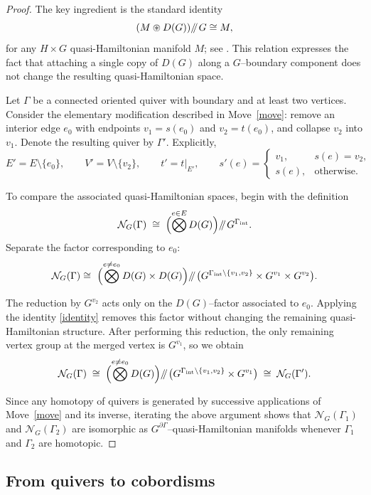 \documentclass[reqno]{amsart}
\theoremstyle{plain}
\theoremstyle{definition}
\newcommand{\N}{\mathcal{N}}
\newcommand{\sll}[1]{\mkern-4mu\mathbin{/\mkern-5mu/}_{\mkern-4mu{#1}}}
\begin{document}
\begin{proof}
The key ingredient is the standard identity
\begin{equation}\label{identity}
    (M \circledast D(G))\sll{} G \cong M,
\end{equation}
for any $H \times G$ quasi-Hamiltonian manifold $M$; see
\cite[Example~9.1]{alekseev1998}.  This relation expresses the fact that attaching a single copy of $D(G)$ along a $G$–boundary component does not change the resulting quasi-Hamiltonian space.

Let $\Gamma$ be a connected oriented quiver with boundary and at least two
vertices.  Consider the elementary modification described in Move~\ref{move}:
remove an interior edge $e_0$ with endpoints $v_1 = s(e_0)$ and
$v_2 = t(e_0)$, and collapse $v_2$ into $v_1$.  Denote the resulting quiver by
$\Gamma'$.  Explicitly,
\[
E' = E \setminus \{e_0\}, \qquad
V' = V \setminus \{v_2\}, \qquad
t' = t|_{E'}, \qquad
s'(e) =
\begin{cases}
v_1, & s(e)=v_2,\\[0.2em]
s(e), & \text{otherwise}.
\end{cases}
\]

To compare the associated quasi-Hamiltonian spaces, begin with the definition
\[
\N_G(\Gamma)
\;\cong\;
\Bigl(\bigotimes^{e\in E} D(G)\Bigr)\sll{} G^{\Gamma_{\mathrm{int}}}.
\]
Separate the factor corresponding to $e_0$:
\[
\N_G(\Gamma)
\cong\
\Bigl(\bigotimes^{e\neq e_0} D(G) \times D(G)\Bigr)
\sll{}
\bigl(G^{\Gamma_{\mathrm{int}}\setminus\{v_1,v_2\}}
      \times G^{v_1} \times G^{v_2}\bigr).
\]

The reduction by $G^{v_2}$ acts only on the $D(G)$–factor associated to $e_0$.
Applying the identity \eqref{identity} removes this factor without changing the
remaining quasi-Hamiltonian structure.  After performing this reduction, the
only remaining vertex group at the merged vertex is $G^{v_1}$, so we obtain
\[
\N_G(\Gamma)
\;\cong\;
\Bigl(\bigotimes^{e\neq e_0} D(G)\Bigr)
\sll{}
\bigl(G^{\Gamma_{\mathrm{int}}\setminus\{v_1,v_2\}} \times G^{v_1}\bigr)
\;\cong\;
\N_G(\Gamma').
\]

Since any homotopy of quivers is generated by successive applications of
Move~\ref{move} and its inverse, iterating the above argument shows that
$\N_G(\Gamma_1)$ and $\N_G(\Gamma_2)$ are isomorphic as
$G^{\partial\Gamma}$–quasi-Hamiltonian manifolds whenever
$\Gamma_1$ and $\Gamma_2$ are homotopic. 
\end{proof}

\subsection{From quivers to cobordisms}
\end{document}
